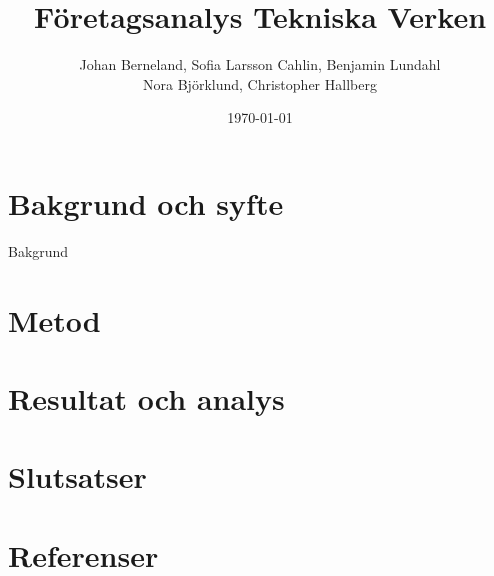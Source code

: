 \documentclass[10pt,a4paper]{article}
\title{Företagsanalys Tekniska Verken}
\author{Johan Berneland, Sofia Larsson Cahlin, Benjamin Lundahl \\
    Nora Björklund, Christopher Hallberg}
\date{\today}
\begin{document}
\maketitle

\newpage

\tableofcontents

\newpage

\section{Bakgrund och syfte}
Bakgrund

\section{Metod}

\section{Resultat och analys}

\section{Slutsatser}

\section{Referenser}
\end{document}
